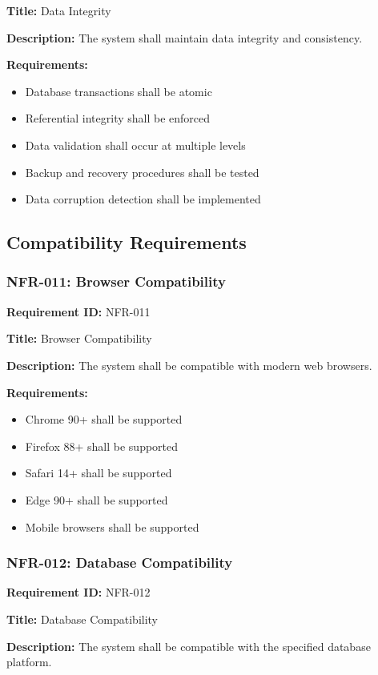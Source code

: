 \documentclass[12pt,a4paper]{article}
\begin{document}
\textbf{Title:} Data Integrity

\textbf{Description:} The system shall maintain data integrity and consistency.

\textbf{Requirements:}
\begin{itemize}
    \item Database transactions shall be atomic
    \item Referential integrity shall be enforced
    \item Data validation shall occur at multiple levels
    \item Backup and recovery procedures shall be tested
    \item Data corruption detection shall be implemented
\end{itemize}

\subsection{Compatibility Requirements}

\subsubsection{NFR-011: Browser Compatibility}

\textbf{Requirement ID:} NFR-011

\textbf{Title:} Browser Compatibility

\textbf{Description:} The system shall be compatible with modern web browsers.

\textbf{Requirements:}
\begin{itemize}
    \item Chrome 90+ shall be supported
    \item Firefox 88+ shall be supported
    \item Safari 14+ shall be supported
    \item Edge 90+ shall be supported
    \item Mobile browsers shall be supported
\end{itemize}

\subsubsection{NFR-012: Database Compatibility}

\textbf{Requirement ID:} NFR-012

\textbf{Title:} Database Compatibility

\textbf{Description:} The system shall be compatible with the specified database platform.
\end{document}
